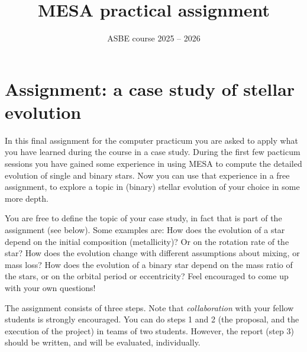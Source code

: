 

\title{\textbf{MESA practical assignment}}
\author{ASBE course 2025 -- 2026}
\date{}
\maketitle




\section*{Assignment: a case study of stellar evolution}

In this final assignment for the computer practicum you are asked to apply what you have learned during the course in a case study. During the first few pacticum sessions you have gained some experience in using MESA to compute the detailed evolution of  single and binary stars. Now you can use that experience in a free assignment, to explore a topic in (binary) stellar evolution of your choice in some more depth. 

\medskip\noindent
You are free to define the topic of your case study, in fact that is part of the assignment (see below). 
Some examples are: How does the evolution of a star depend on the initial composition (metallicity)? Or on the rotation rate of the star? How does the evolution change with different assumptions about mixing, or mass loss? How does the evolution of a binary star depend on the mass ratio of the stars, or on the orbital period or eccentricity? Feel encouraged to come up with your own questions!

\medskip\noindent
The assignment consists of three steps.
Note that \emph{collaboration} with your fellow students is strongly encouraged.
You can do steps 1 and 2 (the proposal, and the execution of the project) in teams of two students. However, the report (step 3) should be written, and will be evaluated, individually.


